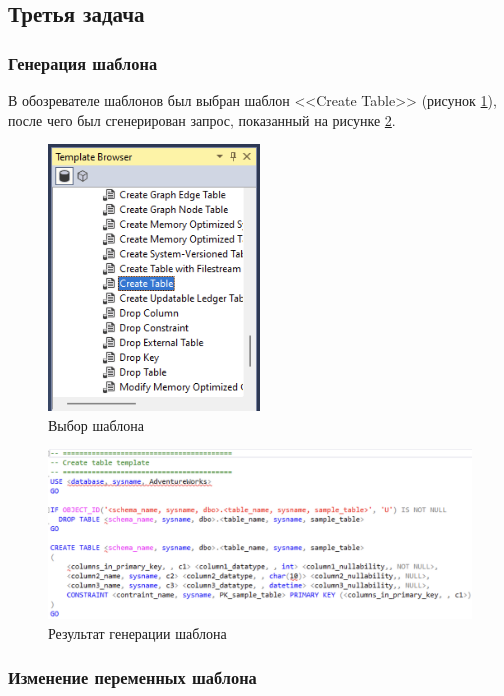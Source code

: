 \documentclass[a4paper, 14pt]{extarticle}
\begin{document}
\subsection{Третья задача}

\subsubsection{Генерация шаблона}

В обозревателе шаблонов был выбран шаблон <<Create Table>> (рисунок
\ref{fig:task-3-1}), после чего был сгенерирован запрос, показанный на рисунке
\ref{fig:task-3-2}.

\begin{figure}[H]
  \centering
  \includegraphics[width=0.5\textwidth]{images/task-3/1.png}
  \caption{Выбор шаблона}
  \label{fig:task-3-1}
\end{figure}

\begin{figure}[H]
  \centering
  \includegraphics[width=\textwidth]{images/task-3/2.png}
  \caption{Результат генерации шаблона}
  \label{fig:task-3-2}
\end{figure}

\subsubsection{Изменение переменных шаблона}
\end{document}
